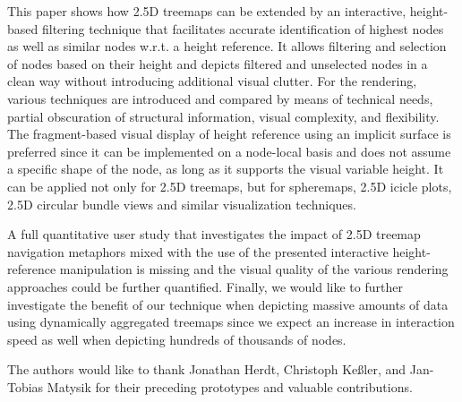 \documentclass[sigconf]{acmart}
\begin{document}
This paper shows how 2.5D treemaps can be extended by an interactive, height-based filtering technique that facilitates accurate identification of highest nodes as well as similar nodes w.r.t. a height reference.
It allows filtering and selection of nodes based on their height and depicts filtered and unselected nodes in a clean way without introducing additional visual clutter.
For the rendering, various techniques are introduced and compared by means of technical needs, partial obscuration of structural information, visual complexity, and flexibility.
The fragment-based visual display of height reference using an implicit surface is preferred since it can be implemented on a node-local basis and does not assume a specific shape of the node, as long as it supports the visual variable height. 
It can be applied not only for 2.5D treemaps, but for spheremaps, 2.5D icicle plots, 2.5D circular bundle views and similar visualization techniques.

A full quantitative user study that investigates the impact of 2.5D treemap navigation metaphors mixed with the use of the presented interactive height-reference manipulation is missing and the visual quality of the various rendering approaches could be further quantified.
Finally, we would like to further investigate the benefit of our technique when depicting massive amounts of data using dynamically aggregated treemaps since we expect an increase in interaction speed as well when depicting hundreds of thousands of nodes.

\begin{acks}
The authors would like to thank Jonathan Herdt, Christoph Keßler, and Jan-Tobias Matysik for their preceding prototypes and valuable contributions.
\end{acks}

\balance


\end{document}
